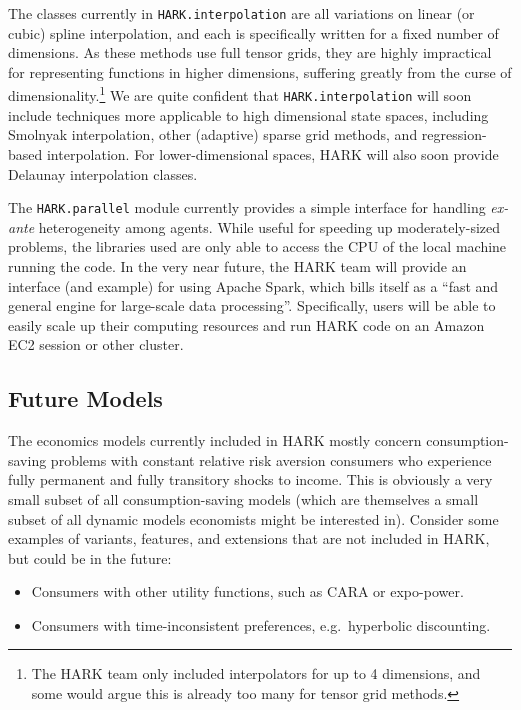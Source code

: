 \documentclass[12pt,titlepage,letterpaper]{econtex}
\begin{document}
{The classes currently in \texttt{HARK.interpolation} are all variations on linear (or cubic) spline interpolation, and each is specifically written for a fixed number of dimensions.  As these methods use full tensor grids, they are highly impractical for representing functions in higher dimensions, suffering greatly from the curse of dimensionality.\footnote{The HARK team only included interpolators for up to 4 dimensions, and some would argue this is already too many for tensor grid methods.}  We are quite confident that \texttt{HARK.interpolation} will soon include techniques more applicable to high dimensional state spaces, including Smolnyak interpolation, other (adaptive) sparse grid methods, and regression-based interpolation.  For lower-dimensional spaces, HARK will also soon provide Delaunay interpolation classes.

The \texttt{HARK.parallel} module currently provides a simple interface for handling \textit{ex-ante} heterogeneity among agents.  While useful for speeding up moderately-sized problems, the libraries used are only able to access the CPU of the local machine running the code.  In the very near future, the HARK team will provide an interface (and example) for using Apache Spark, which bills itself as a ``fast and general engine for large-scale data processing''.  Specifically, users will be able to easily scale up their computing resources and run HARK code on an Amazon EC2 session or other cluster.

\subsection{Future Models}\label{sec:FutureModels}

The economics models currently included in HARK mostly concern consumption-saving problems with constant relative risk aversion consumers who experience fully permanent and fully transitory shocks to income.  This is obviously a very small subset of all consumption-saving models (which are themselves a small subset of all dynamic models economists might be interested in).  Consider some examples of variants, features, and extensions that are not included in HARK, but could be in the future:
\begin{itemize}
\item Consumers with other utility functions, such as CARA or expo-power.

\item Consumers with time-inconsistent preferences, e.g.\ hyperbolic discounting.


\end{itemize}}
\end{document}
